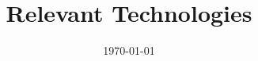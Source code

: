 \documentclass{myproc}
\begin{document}
\small

\setlength\oddsidemargin{-1.2cm}
\setlength\evensidemargin{-0.5cm}
\setlength\textwidth{19cm}
\addtolength\topmargin{-1cm}
\addtolength\textheight{-0.5cm}

\title{\textcolor{red2}{\large\bf Relevant Technologies}}
\date{\normalsize\today}
\maketitle

\tableofcontents








\end{document}
